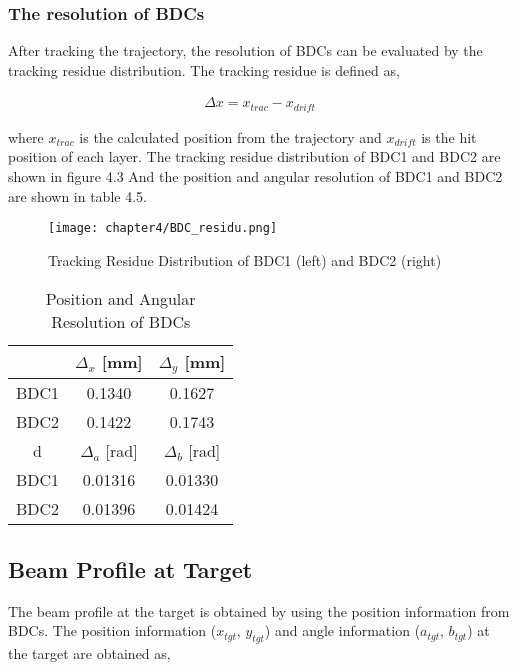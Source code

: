 \subsubsection{The resolution of BDCs}
After tracking the trajectory, the resolution of BDCs can be evaluated by the tracking residue distribution. The tracking residue is defined as,

\begin{align}
    \Delta x = x_{trac} - x_{drift}
\end{align}

where $x_{trac}$ is the calculated position from the trajectory and $x_{drift}$ is the hit position of each layer. The tracking residue distribution of BDC1 and BDC2 are shown in figure 4.3 %
And the position and angular resolution of BDC1 and BDC2 are shown in table 4.5. %

\begin{figure}
    \centering
    \texttt{[image: chapter4/BDC\_residu.png]}
    \caption[Tracking Residue Distribution of BDCs]{Tracking Residue Distribution of BDC1 (left) and BDC2 (right)}
\end{figure}

\begin{table}
    \centering
    \begin{tabular}{c|cc}
    \hline
     & $\Delta_{x}$ [mm] & $\Delta_{y}$ [mm]\\
    \hline
    BDC1 & 0.1340 & 0.1627 \\
    BDC2 & 0.1422 & 0.1743 \\
    \hline \hline
    d& $\Delta_{a}$ [rad] & $\Delta_{b}$ [rad]\\
    \hline
    BDC1 & 0.01316 & 0.01330 \\
    BDC2 & 0.01396 & 0.01424 \\
    \hline
    \end{tabular}
    \caption{Position and Angular Resolution of BDCs}
\end{table}

\subsection{Beam Profile at Target}
The beam profile at the target is obtained by using the position information from BDCs. The position information ($x_{tgt}$, $y_{tgt}$) and angle information ($a_{tgt}$, $b_{tgt}$) at the target are obtained as,


